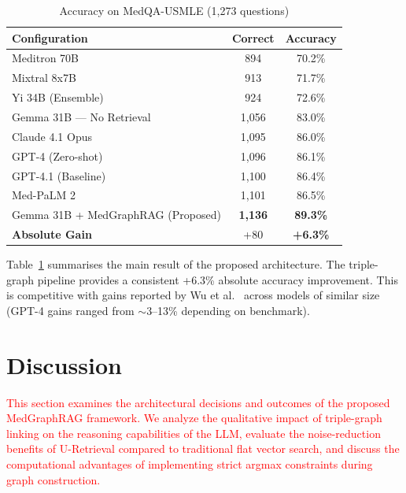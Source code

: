 \documentclass[a4paper,fleqn]{cas-sc}
\begin{document}
\begin{table}[!t]
\centering
\caption{Accuracy on MedQA-USMLE (1{,}273 questions)}
\label{tab:results}
\begin{tabular}{@{}lcc@{}}
\toprule
\textbf{Configuration} & \textbf{Correct} & \textbf{Accuracy} \\ \midrule
Meditron 70B \cite{maharjan2024} & 894 & 70.2\% \\
Mixtral 8x7B \cite{maharjan2024} & 913 & 71.7\% \\
Yi 34B (Ensemble) \cite{maharjan2024} & 924 & 72.6\% \\
Gemma 31B --- No Retrieval & 1,056 & 83.0\% \\
Claude 4.1 Opus \cite{faithful2026} & 1,095 & 86.0\% \\
GPT-4 (Zero-shot) \cite{agent2026} & 1,096 & 86.1\% \\
GPT-4.1 (Baseline) \cite{benchmarking2026} & 1,100 & 86.4\% \\
Med-PaLM 2 \cite{singhal2023medpalm2} & 1,101 & 86.5\% \\ \midrule
Gemma 31B + MedGraphRAG (Proposed) & \textbf{1,136} & \textbf{89.3\%} \\ \midrule
\textbf{Absolute Gain} & +80 & \textbf{+6.3\%} \\ \bottomrule
\end{tabular}
\end{table}

Table~\ref{tab:results} summarises the main result of the proposed architecture. The triple-graph pipeline provides a consistent +6.3\% absolute accuracy improvement. This is competitive with gains reported by Wu et al.\ \cite{wu2024medgraphrag} across models of similar size (GPT-4 gains ranged from $\sim$3--13\% depending on benchmark).


\section{Discussion}
\textcolor{red}{This section examines the architectural decisions and outcomes of the proposed MedGraphRAG framework. We analyze the qualitative impact of triple-graph linking on the reasoning capabilities of the LLM, evaluate the noise-reduction benefits of U-Retrieval compared to traditional flat vector search, and discuss the computational advantages of implementing strict argmax constraints during graph construction.}
\end{document}
